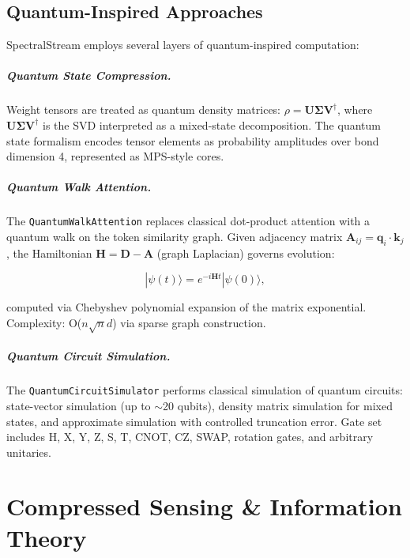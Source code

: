 \documentclass[11pt,a4paper,openright]{book}
\begin{document}
\section{Quantum-Inspired Approaches}

SpectralStream employs several layers of quantum-inspired computation:

\paragraph{Quantum State Compression.}
Weight tensors are treated as quantum density matrices: $\rho = \mathbf{U} \boldsymbol{\Sigma} \mathbf{V}^\dagger$, where $\mathbf{U}\boldsymbol{\Sigma}\mathbf{V}^\dagger$ is the SVD interpreted as a mixed-state decomposition. The quantum state formalism encodes tensor elements as probability amplitudes over bond dimension 4, represented as MPS-style cores.

\paragraph{Quantum Walk Attention.}
The \texttt{QuantumWalkAttention} replaces classical dot-product attention with a quantum walk on the token similarity graph. Given adjacency matrix $\mathbf{A}_{ij} = \mathbf{q}_i \cdot \mathbf{k}_j$, the Hamiltonian $\mathbf{H} = \mathbf{D} - \mathbf{A}$ (graph Laplacian) governs evolution:

\begin{equation}
	\label{eq:quantum_walk}
	|\psi(t)\rangle = e^{-i\mathbf{H}t} |\psi(0)\rangle,
\end{equation}

computed via Chebyshev polynomial expansion of the matrix exponential. Complexity: O($n \sqrt{n} d$) via sparse graph construction.

\paragraph{Quantum Circuit Simulation.}
The \texttt{QuantumCircuitSimulator} performs classical simulation of quantum circuits: state-vector simulation (up to $\sim$20 qubits), density matrix simulation for mixed states, and approximate simulation with controlled truncation error. Gate set includes H, X, Y, Z, S, T, CNOT, CZ, SWAP, rotation gates, and arbitrary unitaries.

\chapter{Compressed Sensing \& Information Theory}
\label{ch:sensing}
\end{document}
